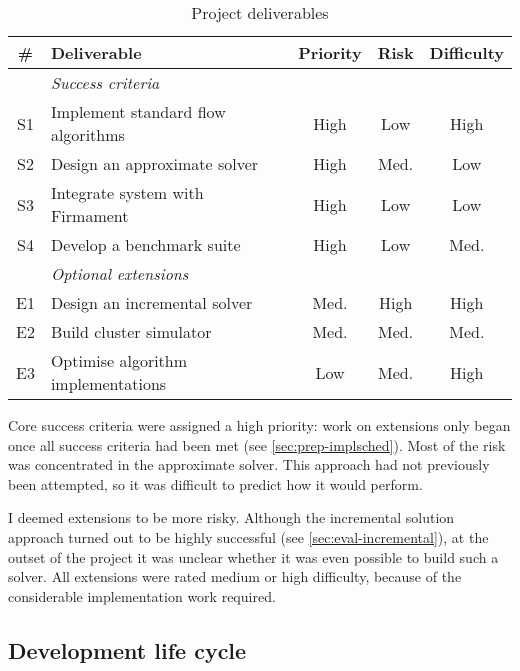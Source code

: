 \begin{table}
    \centering
    \begin{tabular}{clccc}
        \textbf{\#} & \textbf{Deliverable} & \textbf{Priority} & \textbf{Risk} & \textbf{Difficulty}
        \tabularnewline
        \hline
        & \textit{Success criteria} \tabularnewline
        S1 & Implement standard flow algorithms & High & Low & High \tabularnewline
        S2 & Design an approximate solver & High & Med. & Low \tabularnewline
        S3 & Integrate system with Firmament & High & Low & Low \tabularnewline
        S4 & Develop a benchmark suite  & High & Low & Med. \tabularnewline
        \hline
        & \textit{Optional extensions} \tabularnewline
        E1 & Design an incremental solver & Med. & High & High \tabularnewline
        E2 & Build cluster simulator & Med. & Med. & Med. \tabularnewline
        E3 & Optimise algorithm implementations & Low & Med. & High \tabularnewline
        \hline
    \end{tabular}
    \caption{Project deliverables}
    \label{table:prep-project-requirements}
\end{table}

Core success criteria were assigned a high priority: work on extensions only began once all success criteria had been met (see \cref{sec:prep-implsched}). Most of the risk was concentrated in the approximate solver. This approach had not previously been attempted, so it was difficult to predict how it would perform.

I deemed extensions to be more risky. Although the incremental solution approach turned out to be highly successful (see \cref{sec:eval-incremental}), at the outset of the project it was unclear whether it was even possible to build such a solver. All extensions were rated medium or high difficulty, because of the considerable implementation work required.

\subsection{Development life cycle}
\label{sec:prep-management-model}


